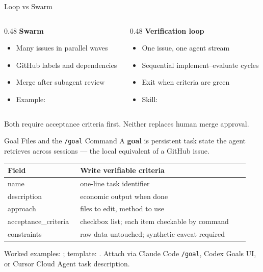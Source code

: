 \begin{frame}{Loop vs Swarm}
  \begin{columns}[T,onlytextwidth]
    \begin{column}{0.48\textwidth}
      \textbf{Swarm}
      \begin{itemize}
        \item Many issues in parallel waves
        \item GitHub labels and dependencies
        \item Merge after subagent review
        \item Example: 
      \end{itemize}
    \end{column}
    \begin{column}{0.48\textwidth}
      \textbf{Verification loop}
      \begin{itemize}
        \item One issue, one agent stream
        \item Sequential implement--evaluate cycles
        \item Exit when criteria are green
        \item Skill: 
      \end{itemize}
    \end{column}
  \end{columns}
  \vspace{0.6em}
  Both require acceptance criteria first. Neither replaces human merge approval.
\end{frame}

\begin{frame}{Goal Files and the \texttt{/goal} Command}
  A \textbf{goal} is persistent task state the agent retrieves across sessions --- the local equivalent of a GitHub issue.
  \vspace{0.3em}
  \footnotesize
  \begin{tabular}{@{}p{0.28\linewidth}p{0.66\linewidth}@{}}
    \toprule
    \textbf{Field} & \textbf{Write verifiable criteria} \\
    \midrule
    name & one-line task identifier \\
    description & economic output when done \\
    approach & files to edit, method to use \\
    acceptance\_criteria & checkbox list; each item checkable by command \\
    constraints & raw data untouched; synthetic caveat required \\
    \bottomrule
  \end{tabular}
  \vspace{0.4em}
  {\small Worked examples: ; template: . Attach via Claude Code \texttt{/goal}, Codex Goals UI, or Cursor Cloud Agent task description.}
\end{frame}

